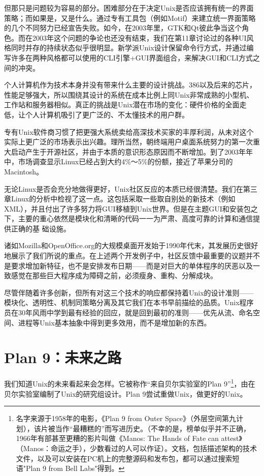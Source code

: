 \documentclass[12pt,oneside]{book}
\begin{document}
但那只是问题较为容易的部分。困难部分在于决定Unix是否应该拥有统一的界面策略；而如果是，又是什么。通过专有工具包（例如Motif）来建立统一界面策略的几个不同努力已经宣告失败。如今，在2003年里，GTK和Qt彼此争当这个角色。而在2003年这个问题的争论也还没有结束，我们在第11章讨论过的各种UI风格同时并存的持续状态似乎很明显。新学派Unix设计保留命令行方式，并通过编写许多在两种风格都可以使用的CLI引擎+GUI界面组合，来解决GUI和CLI方式之间的冲突。

个人计算机作为技术本身并没有带来什么主要的设计挑战。386以及后来的芯片，性能足够强大，所以围绕其设计的系统在成本比例上同Unix非常成熟的小型机、工作站和服务器相似。真正的挑战是Unix潜在市场的变化：硬件价格的全面走低，让个人计算机吸引了更广泛的、不太懂技术的用户群。

专有Unix软件商习惯了把更强大系统卖给高深技术买家的丰厚利润，从未对这个实际上更广泛的市场表示出兴趣。理所当然，朝终端用户桌面系统努力的第一次重大启动产生于开源社区，并由于本质的意识形态原因而不断增加。到了2003年年中，市场调查显示Linux已经占到大约4\%{}～5\%{}的份额，接近了苹果分司的Macintosh。

无论Linux是否会充分地做得更好，Unix社区反应的本质已经很清楚。我们在第三章Linux的分析中检视了这一点。这包括采取一些取自别处的新技术（例如XML），并且付出了许多努力将GUI移植到Unix世界。但是在主题GUI和安装包之下，主要的重心依然是模块化和清晰的代码一一为严肃、高度可靠的计算和通信提供正确的基
础设施。

诸如Mozilla和OpenOffice.org的大规模桌面开发始于1990年代末，其发展历史很好地展示了我们所说的重点。在上述两个开发例子中，社区反馈中最重要的议题并不是要求增加新特征，也不是安排发布日期——而是对巨大的单体程序的厌恶以及一致感觉在那些巨大程序成为障碍之前，必须瘦身、重构、分解成块。

尽管伴随着许多创新，但所有对这三个技术的响应都保持着Unix的设计准则——模块化、透明性、机制同策略分离及其它我们在本书早前描绘的品质。Unix程序员在30年风雨中学到最有经验的回应，就是回到最初的准则——优先从流、命名空间、进程等Unix基本抽象中得到更多效用，而不是增加新的东西。

\section{Plan 9：未来之路}
我们知道Unix的未来看起来会怎样。它被称作“来自贝尔实验室的Plan 9”\footnote{名字来源于1958年的电影，《Plan 9 from Outer Space》（外层空间第九计划），该片被当作“最糟糕的”而写进历史。（不幸的是，榜单似乎并不正确，1966年有部甚至更糟的影片叫做《Manos: The Hands of Fate can attest》（Manos：命运之手），少数看过的人可以作证）。文档，包括描述架构的技术文件，以及可以安装在PC机上的完整源码和发布包，都可以通过搜索短语"Plan 9 from Bell Labs"得到。}，由在贝尔实验室编制了Unix的研究组设计。Plan 9尝试重做Unix，做更好的Unix。
\end{document}
